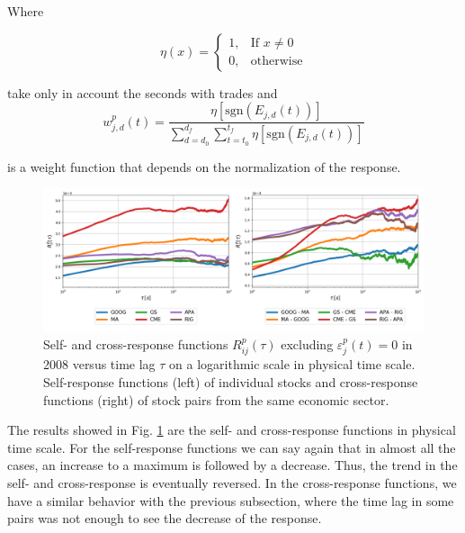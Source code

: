 Where

\begin{equation}
    \eta\left(x\right)=\left\{ \begin{array}{cc}
    1, & \text{If }x\ne0 \\
    0, & \text{otherwise}
    \end{array}\right.
\end{equation}

take only in account the seconds with trades and
\begin{equation}
    w_{j,d}^{p}\left(t\right) = \frac{\eta\left[\text{sgn}
    \left(E_{j,d}\left( t\right)\right)\right]}{\sum_{d=d_{0}}^{d_{f}}
    \sum_{t=t_{0}}^{t_{f}} \eta\left[\text{sgn}\left(E_{j,d}
    \left(t\right)\right)\right]}
\end{equation}

is a weight function that depends on the normalization of the response.

\begin{figure}[htbp]
    \centering
    \includegraphics[width=\textwidth]
    {figures/03_responses_physical_scale_2008.png}
    \caption{Self- and cross-response functions $R^{p}_{ij}\left(\tau\right)$
             excluding $\varepsilon^{p}_{j}\left(t\right) = 0$ in 2008 versus
             time lag $\tau$ on a logarithmic scale in physical time scale.
             Self-response functions (left) of individual stocks and
             cross-response functions (right) of stock pairs from the same
             economic sector.}
    \label{fig:market_response_time_scale}
\end{figure}

The results showed in Fig. \ref{fig:market_response_time_scale} are the
self- and cross-response functions in physical time scale. For the
self-response functions we can say again that in almost all the cases, an
increase to a maximum is followed by a decrease. Thus, the trend in the self-
and cross-response is eventually reversed.
In the cross-response functions, we have a similar behavior with the previous
subsection, where the time lag in some pairs was not enough to see the decrease
of the response.

